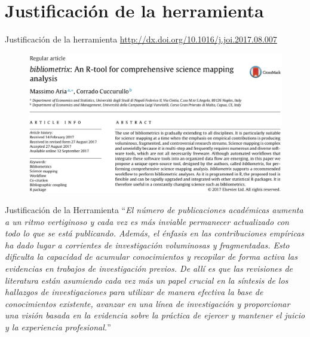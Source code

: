 \documentclass{beamer}
\begin{document}
\section{Justificación de la herramienta}
\begin{frame}{Justificación de la herramienta}
\tiny{\textcolor{blue}{\url{http://dx.doi.org/10.1016/j.joi.2017.08.007}}}
\begin{figure}
\centering
\includegraphics[width=.9\textwidth]{bibliometrix.png}
\end{figure}
\cite{Aria2017}
\end{frame}

\begin{frame}{Justificación de la Herramienta}
``\textit{El número de publicaciones académicas aumenta a un ritmo vertiginoso y cada vez es más inviable permanecer actualizado con todo lo que se está publicando. Además, el énfasis en las contribuciones empíricas ha dado lugar a corrientes de investigación voluminosas y fragmentadas. Esto dificulta la capacidad de acumular conocimientos y recopilar de forma activa las evidencias en trabajos de investigación previos. De allí es que las revisiones de literatura están asumiendo cada vez más un papel crucial en la síntesis de los hallazgos de investigaciones para utilizar de manera efectiva la base de conocimientos existente, avanzar en una línea de investigación y proporcionar una visión basada en la evidencia sobre la práctica de ejercer y mantener el juicio y la experiencia profesional.}''\\
\cite[p. 959]{Aria2017}
\end{frame}
\end{document}
